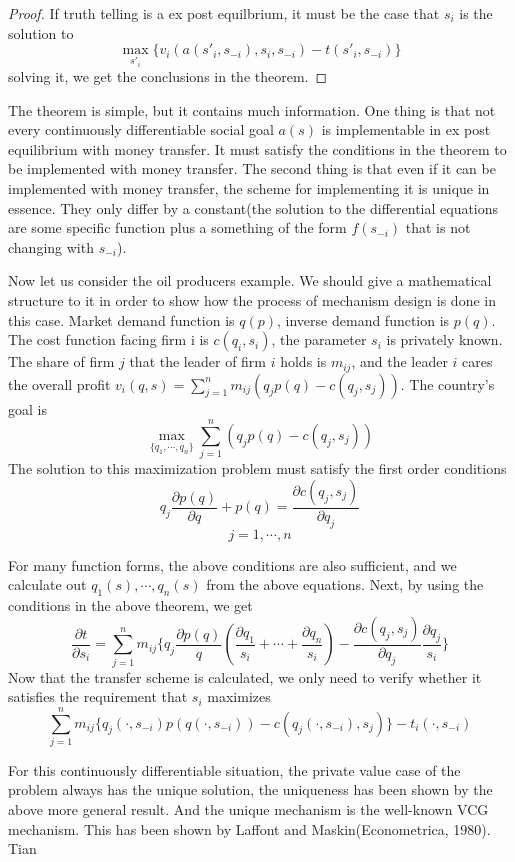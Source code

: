 \begin{prop}
\begin{thm}
 
\end{thm}
\begin{proof}
 If truth telling is a ex post equilbrium, it must be the case that $s_i$ is the solution to
 $$\max_{s'_i} \{v_i(a(s'_i,s_{-i}),s_i,s_{-i})-t(s'_i,s_{-i})\}$$
 solving it, we get the conclusions in the theorem.
\end{proof}

The theorem is simple, but it contains much information. One thing is that not every continuously differentiable
social goal $a(s)$ is implementable in ex post equilibrium with money transfer. It must satisfy the conditions in the theorem 
to be implemented with money transfer. The second thing is that even if it can be implemented with money transfer, the scheme for 
implementing it is unique in essence. They only differ by a constant(the solution to the differential equations are some specific
function plus a something of the form $f(s_{-i})$ that is not changing with $s_{-i}$).

Now let us consider the oil producers example. We should give a mathematical structure to it in order to show how the process of mechanism
design is done in this case. Market demand function is $q(p)$, inverse demand function is $p(q)$. The cost function 
facing firm i is $c(q_i,s_i)$, the parameter $s_i$ is privately known. The share of firm $j$
that the leader of firm  $i$ holds is $m_{ij}$, and  the leader $i$ cares the overall profit 
$v_i(q,s)=\sum_{j=1}^{n} m_{ij}(q_jp(q)-c(q_j,s_j))$. The country's goal is 
$$\max_{\{q_1,\cdots,q_n\}}\sum_{j=1}^{n} (q_jp(q)-c(q_j,s_j)) $$
The solution to this maximization problem must satisfy the first order conditions
$$q_j \frac {\partial p(q)}{\partial q}+p(q)=\frac {\partial c(q_j,s_j)}{\partial q_j}$$
$$j=1,\cdots,n$$

For many function forms, the above conditions are also sufficient, and we calculate out ${q_1(s),\cdots,q_n(s)}$ from the above 
equations. Next, by using the conditions in the above theorem, we get 
$$\frac{\partial t}{\partial s_i} = \sum_{j=1}^{n} m_{ij}\{q_j\frac {\partial p(q)}{q}(\frac{\partial q_1}{s_i}+\cdots+\frac{\partial q_n}{s_i})-\frac {\partial c(q_j,s_j)}{\partial q_j}\frac{\partial q_j}{s_i}\}$$
Now that the transfer scheme is calculated, we only need to verify whether it satisfies the requirement that $s_i$ maximizes  
$$\sum_{j=1}^{n} m_{ij}\{q_j(\cdot,s_{-i})p(q(\cdot,s_{-i}))-c(q_j(\cdot,s_{-i}),s_j)\}-t_i(\cdot,s_{-i})$$

For this continuously differentiable situation, the private value case of the problem always has the unique solution, the uniqueness
has been shown by the above more general result. And the unique mechanism is the well-known VCG mechanism. This has been shown by
Laffont and Maskin(Econometrica, 1980). Tian


\end{prop}
